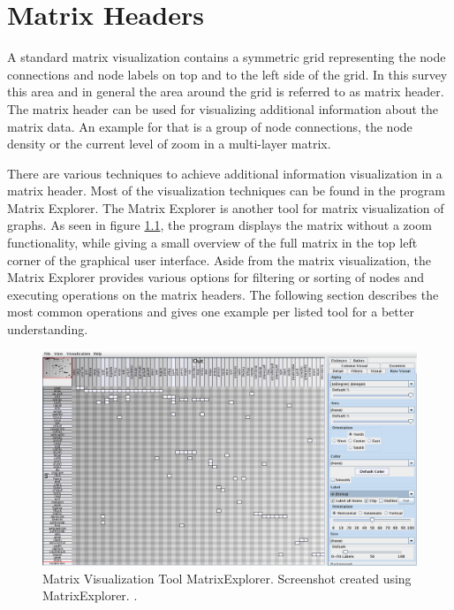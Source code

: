 %
%
% 
% 
% 


\chapter{Matrix Headers}
\label{chap:headers}

A standard matrix visualization contains a symmetric grid representing the node connections and node labels on top and to the left side of the grid. In this survey this area and in general the area around the grid is referred to as matrix header. The matrix header can be used for visualizing additional information about the matrix data. An example for that is a group of node connections, the node density or the current level of zoom in a multi-layer matrix.

There are various techniques to achieve additional information visualization in a matrix header. Most of the visualization techniques can be found in the program Matrix Explorer. The Matrix Explorer is another tool for matrix visualization of graphs. As seen in figure \ref{fig:header_matrixexplorer}, the program displays the matrix without a zoom functionality, while giving a small overview of the full matrix in the top left corner of the graphical user interface. Aside from the matrix visualization, the Matrix Explorer provides various options for filtering or sorting of nodes and executing operations on the matrix headers. The following section describes the most common operations and gives one example per listed tool for a better understanding. 

\begin{figure}[H]
  \includegraphics[width=\textwidth]{images/Header_MatrixExplorer.png}
  \caption{Matrix Visualization Tool MatrixExplorer. Screenshot created using MatrixExplorer. \citep{henry-phd-2008}. \label{fig:header_matrixexplorer}}
\end{figure}

